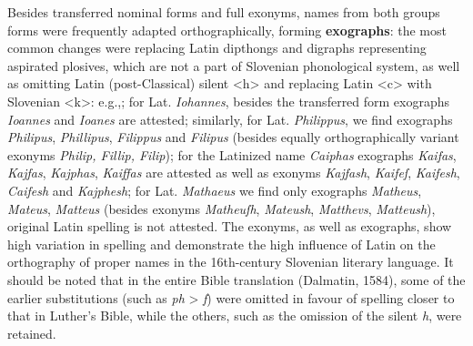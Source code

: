 \documentclass[output=paper,colorlinks,citecolor=brown,arabicfont,chinesefont]{langscibook}
\begin{document}
Besides transferred nominal forms and full exonyms, names from both groups forms were frequently adapted orthographically, forming \textbf{exographs}: the most common changes were replacing Latin dipthongs and digraphs representing aspirated plosives, which are not a part of Slovenian phonological system, as well as omitting Latin (post-Classical) silent <h> and replacing Latin <c> with Slovenian <k>: e.g.,; for Lat. \emph{Iohannes}, besides the transferred form exographs \emph{Ioannes} and \emph{Ioanes} are attested; similarly, for Lat. \emph{Philippus}, we find exographs \emph{Philipus}, \emph{Phillipus}, \emph{Filippus} and \emph{Filipus} (besides equally orthographically variant exonyms \emph{Philip, Fillip, Filip}); for the Latinized name \emph{Caiphas} exographs \emph{Kaifas}, \emph{Kajfas}, \emph{Kajphas}, \emph{Kaiffas} are attested as well as exonyms \emph{Kajfash}, \emph{Kaifeſ}, \emph{Kaifesh}, \emph{Caifesh} and \emph{Kajphesh}; for Lat. \emph{Mathaeus} we find only exographs \emph{Matheus}, \emph{Mateus}, \emph{Matteus} (besides exonyms \emph{Matheuſh}, \emph{Mateush}, \emph{Matthevs}, \emph{Matteush}), original Latin spelling is not attested. The exonyms, as well as exographs, show high variation in spelling and demonstrate the high influence of Latin on the orthography of proper names in the 16th-century Slovenian literary language. It should be noted that in the entire Bible translation (Dalmatin, 1584), some of the earlier substitutions (such as \emph{ph} > \emph{f}) were omitted in favour of spelling closer to that in Luther’s Bible, while the others, such as the omission of the silent \emph{h}, were retained.
\end{document}
